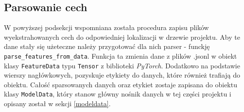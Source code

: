 \subsection{Parsowanie cech}
W powyższej podsekcji wspomniana została procedura zapisu plików wyekstrahowanych cech do
odpowiedniej lokalizacji w drzewie projektu. Aby te dane stały się użeteczne należy przygotować
dla nich parser - funckję \verb|parse_features_from_data|. Funkcja ta zmienia dane z plików .jsonl
w obiekt klasy \verb|FeatureData| typu \verb|Tensor| z biblioteki \textit{PyTorch}. Dodatkowo
na podstawie wierszy nagłówkowych, pozyskuje etykiety do danych, które również trafiają do obiektu.
Całość sparsowanych danych oraz etykiet zostaje zapisana do obiektu klasy \verb|ModelData|, 
który stanow główny nośnik danych w tej części projektu i opisany został w sekcji \ref{modeldata}.

